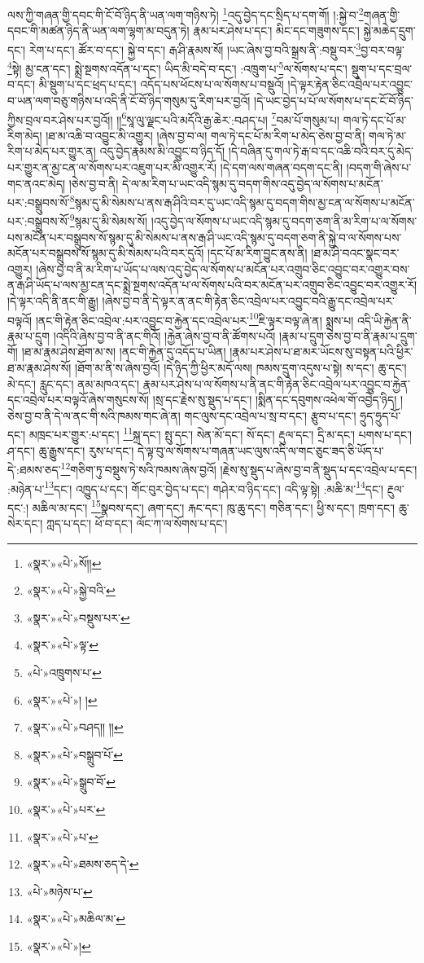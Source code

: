 ལས་ཀྱི་གཞན་གྱི་དབང་གི་ངོ་བོ་ཉིད་ནི་ཡན་ལག་གཉིས་ཏེ། \footnote{«སྣར་»«པེ་»སོ།། }འདུ་བྱེད་དང་སྲིད་པ་དག་གོ། །:སྐྱེ་བ་\footnote{«སྣར་»«པེ་»སྐྱེ་བའི་}གཞན་གྱི་དབང་གི་མཚན་ཉིད་ནི་ཡན་ལག་ལྷག་མ་བདུན་ཏེ། རྣམ་པར་ཤེས་པ་དང་། མིང་དང་གཟུགས་དང་། སྐྱེ་མཆེད་དྲུག་དང་། རེག་པ་དང་། ཚོར་བ་དང་། སྐྱེ་བ་དང་། རྒ་ཤི་རྣམས་སོ། །ཡང་ཞེས་བྱ་བའི་སྒྲས་ནི་:བསྡུ་བར་\footnote{«སྣར་»«པེ་»བསྡུས་པར་}བྱ་བར་བལྟ་\footnote{«སྣར་»«པེ་»ལྟ་}སྟེ། མྱ་ངན་དང་། སྨྲེ་སྔགས་འདོན་པ་དང་། ཡིད་མི་བདེ་བ་དང་། :འཁྲུག་པ་\footnote{«པེ་»འཁྲུགས་པ་}ལ་སོགས་པ་དང་། སྡུག་པ་དང་བྲལ་བ་དང་། མི་སྡུག་པ་དང་ཕྲད་པ་དང་། འདོད་པས་ཕོངས་པ་ལ་སོགས་པ་བསྡུའོ། །དེ་ལྟར་རྟེན་ཅིང་འབྲེལ་པར་འབྱུང་བ་ཡན་ལག་བཅུ་གཉིས་པ་འདི་ནི་ངོ་བོ་ཉིད་གསུམ་དུ་རིག་པར་བྱའོ། །དེ་ཡང་བྱེད་པ་པོ་ལ་སོགས་པ་དང་ངོ་བོ་ཉིད་ཀྱིས་བྲལ་བར་ཤེས་པར་བྱའོ།། །།\footnote{«སྣར་»«པེ་»། །}སཱ་ལུ་ལྗང་པའི་མདོའི་རྒྱ་ཆེར་:བཤད་པ། \footnote{«སྣར་»«པེ་»བཤད།། །།}བམ་པོ་གསུམ་པ། གལ་ཏེ་དང་པོ་མ་རིག་མེད། །ཐ་མ་འཆི་བ་འབྱུང་མི་འགྱུར། །ཞེས་བྱ་བ་ལ། གལ་ཏེ་དང་པོ་མ་རིག་པ་མེད་ཅེས་བྱ་བ་ནི། གལ་ཏེ་མ་རིག་པ་མེད་པར་གྱུར་ན། འདུ་བྱེད་རྣམས་མི་འབྱུང་བ་ཉིད་དོ། །དེ་བཞིན་དུ་གལ་ཏེ་རྒ་བ་དང་འཆི་བའི་བར་དུ་མེད་པར་གྱུར་ན་མྱ་ངན་ལ་སོགས་པར་འཇུག་པར་མི་འགྱུར་རོ། །དེ་དག་ལས་གཞན་བདག་དང་ནི། །བདག་གི་ཞེས་པ་གང་ནའང་མེད། །ཅེས་བྱ་བ་ནི། དེ་ལ་མ་རིག་པ་ཡང་འདི་སྙམ་དུ་བདག་གིས་འདུ་བྱེད་ལ་སོགས་པ་མངོན་པར་:བསྒྲུབས་སོ་\footnote{«སྣར་»«པེ་»བསྒྲུབ་པོ་}སྙམ་དུ་མི་སེམས་པ་ནས་རྒ་ཤིའི་བར་དུ་ཡང་འདི་སྙམ་དུ་བདག་གིས་མྱ་ངན་ལ་སོགས་པ་མངོན་པར་:བསྒྲུབས་སོ་\footnote{«སྣར་»«པེ་»སྒྲུབ་བོ་}སྙམ་དུ་མི་སེམས་སོ། །འདུ་བྱེད་ལ་སོགས་པ་ཡང་འདི་སྙམ་དུ་བདག་ཅག་ནི་མ་རིག་པ་ལ་སོགས་པས་མངོན་པར་བསྒྲུབས་སོ་སྙམ་དུ་མི་སེམས་པ་ནས་རྒ་ཤི་ཡང་འདི་སྙམ་དུ་བདག་ཅག་ནི་སྐྱེ་བ་ལ་སོགས་པས་མངོན་པར་བསྒྲུབས་སོ་སྙམ་དུ་མི་སེམས་པའི་བར་དུའོ། །དང་པོ་མ་རིག་བྱུང་ནས་ནི། །ཐ་མ་ཤི་བའང་སྣང་བར་འགྱུར། །ཞེས་བྱ་བ་ནི་མ་རིག་པ་ཡོད་པ་ལས་འདུ་བྱེད་ལ་སོགས་པ་མངོན་པར་འགྲུབ་ཅིང་འབྱུང་བར་འགྱུར་བས་ན་རྒ་ཤི་ཡོད་པ་ལས་མྱ་ངན་དང་སྨྲེ་སྔགས་འདོན་པ་ལ་སོགས་པའི་བར་མངོན་པར་འགྲུབ་ཅིང་འབྱུང་བར་འགྱུར་རོ། །དེ་ལྟར་འདི་ནི་ནང་གི་རྒྱུ། །ཞེས་བྱ་བ་ནི་དེ་ལྟར་ན་ནང་གི་རྟེན་ཅིང་འབྲེལ་པར་འབྱུང་བའི་རྒྱུ་དང་འབྲེལ་པར་བལྟའོ། །ནང་གི་རྟེན་ཅིང་འབྲེལ་:པར་འབྱུང་བ་རྐྱེན་དང་འབྲེལ་པར་\footnote{«སྣར་»«པེ་»པར་}ཇི་ལྟར་བལྟ་ཞེ་ན། སྨྲས་པ། འདི་ཡི་རྐྱེན་ནི་རྣམ་པ་དྲུག །འདིའི་ཞེས་བྱ་བ་ནི་ནང་གིའོ། །རྐྱེན་ཞེས་བྱ་བ་ནི་ཚོགས་པའོ། །རྣམ་པ་དྲུག་ཅེས་བྱ་བ་ནི་རྣམ་པ་དྲུག་གོ། །ཐ་མ་རྣམ་ཤེས་ཐོག་མ་ས། །ནང་གི་རྐྱེན་དུ་འདོད་པ་ཡིན། །རྣམ་པར་ཤེས་པ་ཐ་མར་ཡོངས་སུ་བསྟན་པའི་ཕྱིར་ཐ་མ་རྣམ་ཤེས་སོ། །ཐོག་མ་ནི་ས་ཞེས་བྱའོ། །དེ་ཉིད་ཀྱི་ཕྱིར་མདོ་ལས། ཁམས་དྲུག་འདུས་པ་སྟེ། ས་དང་། ཆུ་དང་། མེ་དང་། རླུང་དང་། ནམ་མཁའ་དང་། རྣམ་པར་ཤེས་པ་ལ་སོགས་པ་ནི་ནང་གི་རྟེན་ཅིང་འབྲེལ་པར་འབྱུང་བ་རྐྱེན་དང་འབྲེལ་པར་བལྟའོ་ཞེས་གསུངས་སོ། །སྲ་དང་རྗེས་སུ་སྡུད་པ་དང་། །སྨིན་དང་དབུགས་འཕེལ་གོ་འབྱེད་ཉིད། །ཅེས་བྱ་བ་ནི་དེ་ལ་ནང་གི་སའི་ཁམས་གང་ཞེ་ན། གང་ལུས་དང་འབྲེལ་པ་སྲ་བ་དང་། རྩུབ་པ་དང་། ཧྲུད་ཧྲུད་པོ་དང་། མཁྲང་པར་གྱུར་:པ་དང་། \footnote{«སྣར་»«པེ་»པ་}སྐྲ་དང་། སྤུ་དང་། སེན་མོ་དང་། སོ་དང་། རྡུལ་དང་། དྲི་མ་དང་། པགས་པ་དང་། ཤ་དང་། ཆུ་རྒྱུས་དང་། རུས་པ་དང་། དེ་ལྟ་བུ་ལ་སོགས་པ་གཞན་ཡང་ལུས་འདི་ལ་གང་ཅུང་ཟད་ཅི་ཡོད་པ་དེ་:ཐམས་ཅད་\footnote{«སྣར་»«པེ་»ཐམས་ཅད་དེ་}གཅིག་ཏུ་བསྡུས་ཏེ་སའི་ཁམས་ཞེས་བྱའོ། །རྗེས་སུ་སྡུད་པ་ཞེས་བྱ་བ་ནི་སྡུད་པ་དང་འབྲེལ་པ་དང་། :མཉེན་པ་\footnote{«པེ་»མཉེས་པ་}དང་། འཁྱུད་པ་དང་། གོང་བུར་བྱེད་པ་དང་། གཤེར་བ་ཉིད་དང་། འདི་ལྟ་སྟེ། :མཆི་མ་\footnote{«སྣར་»«པེ་»མཆིལ་མ་}དང་། རྔུལ་དང་:། མཆིལ་མ་དང་། \footnote{«སྣར་»«པེ་»།  }སྣབས་དང་། ཞག་དང་། རྐང་དང་། ཁུ་ཆུ་དང་། གཅིན་དང་། ཕྱི་ས་དང་། ཁྲག་དང་། ཆུ་སེར་དང་། ཀླད་པ་དང་། ཕོ་བ་དང་། ལོང་ཀ་ལ་སོགས་པ་དང་། 